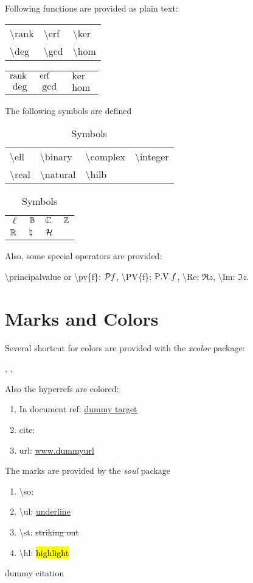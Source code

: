 \documentclass{article}
\def\tbs{\textbackslash}
\begin{document}
Following functions are provided as plain text:
\begin{table}[hpb]
\centering
\begin{tabular}{lll}
\tbs rank & \tbs erf & \tbs ker \\
\tbs deg  & \tbs gcd & \tbs hom
\end{tabular}
\begin{tabular}{|lll}
$\rank$ & $\erf$ & $\ker$ \\
$\deg$ & $\gcd$ & $\hom$
\end{tabular}
\end{table}

The following symbols are defined\linebreak[0]
\begin{table}[!hpb]
    \caption{Symbols}\label{tab:sym}
\centering
\begin{tabular}{llll}
\tbs ell & \tbs binary & \tbs complex & \tbs integer \\
\tbs real & \tbs natural & \tbs hilb  &
\end{tabular}
\begin{tabular}{|llll}
$\ell$ & $\mathbb{B}$ & $\mathbb{C}$ & $\mathbb{Z}$\\
$\mathbb{R}$ & $\natural$ & $\mathcal{H}$ &
\end{tabular}
\end{table}

Also, some special operators are provided:

\tbs principalvalue or \tbs pv\{f\}: $\pv{f}$, \tbs PV\{f\}: $\PV{f}$, \tbs Re:
$\Re{z}$, \tbs Im: $\Im{z}$.

\section{Marks and Colors}

Several shortcut for colors are provided with the \emph{xcolor} package:

\red{\tbs red}, \blue{\tbs blue}, \green{\tbs green}

Also the hyperrefs are colored:

\begin{enumerate}
    \item In document ref: \hyperref[dummylabel]{dummy target}\label{dummylabel}
    \item cite: \cite{dummy}
    \item url: \url{www.dummyurl}
\end{enumerate}

The marks are provided by the \emph{soul} package
\begin{enumerate}
    \item \tbs so: 
    \item \tbs ul: \ul{underline} 
    \item \tbs st: \st{striking out}
    \item \tbs hl: \hl{highlight}
\end{enumerate}

\blindtext


\begin{thebibliography}{1}
     dummy citation
\end{thebibliography}
\end{document}

